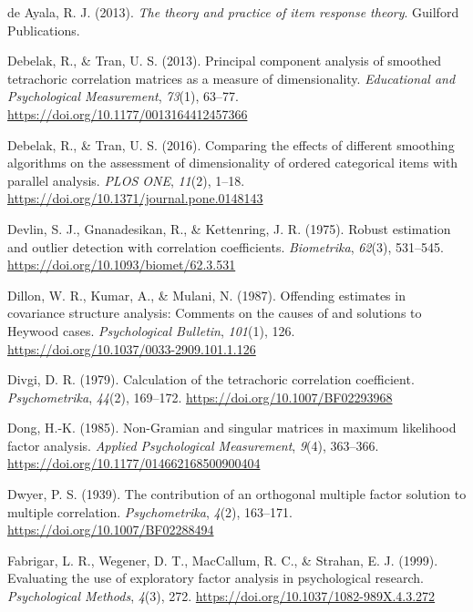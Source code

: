 \documentclass[
  english,
  man]{apa6}
\begin{document}
\leavevmode\hypertarget{ref-de2013theory}{}%
de Ayala, R. J. (2013). \emph{The theory and practice of item response theory}. Guilford Publications.

\leavevmode\hypertarget{ref-debelak2013}{}%
Debelak, R., \& Tran, U. S. (2013). Principal component analysis of smoothed tetrachoric correlation matrices as a measure of dimensionality. \emph{Educational and Psychological Measurement}, \emph{73}(1), 63--77. \url{https://doi.org/10.1177/0013164412457366}

\leavevmode\hypertarget{ref-debelak2016}{}%
Debelak, R., \& Tran, U. S. (2016). Comparing the effects of different smoothing algorithms on the assessment of dimensionality of ordered categorical items with parallel analysis. \emph{PLOS ONE}, \emph{11}(2), 1--18. \url{https://doi.org/10.1371/journal.pone.0148143}

\leavevmode\hypertarget{ref-devlin1975robust}{}%
Devlin, S. J., Gnanadesikan, R., \& Kettenring, J. R. (1975). Robust estimation and outlier detection with correlation coefficients. \emph{Biometrika}, \emph{62}(3), 531--545. \url{https://doi.org/10.1093/biomet/62.3.531}

\leavevmode\hypertarget{ref-dillon1987}{}%
Dillon, W. R., Kumar, A., \& Mulani, N. (1987). Offending estimates in covariance structure analysis: Comments on the causes of and solutions to Heywood cases. \emph{Psychological Bulletin}, \emph{101}(1), 126. \url{https://doi.org/10.1037/0033-2909.101.1.126}

\leavevmode\hypertarget{ref-divgi1979}{}%
Divgi, D. R. (1979). Calculation of the tetrachoric correlation coefficient. \emph{Psychometrika}, \emph{44}(2), 169--172. \url{https://doi.org/10.1007/BF02293968}

\leavevmode\hypertarget{ref-dong1985non}{}%
Dong, H.-K. (1985). Non-Gramian and singular matrices in maximum likelihood factor analysis. \emph{Applied Psychological Measurement}, \emph{9}(4), 363--366. \url{https://doi.org/10.1177/014662168500900404}

\leavevmode\hypertarget{ref-dwyer1939contribution}{}%
Dwyer, P. S. (1939). The contribution of an orthogonal multiple factor solution to multiple correlation. \emph{Psychometrika}, \emph{4}(2), 163--171. \url{https://doi.org/10.1007/BF02288494}

\leavevmode\hypertarget{ref-fabrigar1999evaluating}{}%
Fabrigar, L. R., Wegener, D. T., MacCallum, R. C., \& Strahan, E. J. (1999). Evaluating the use of exploratory factor analysis in psychological research. \emph{Psychological Methods}, \emph{4}(3), 272. \url{https://doi.org/10.1037/1082-989X.4.3.272}
\end{document}
